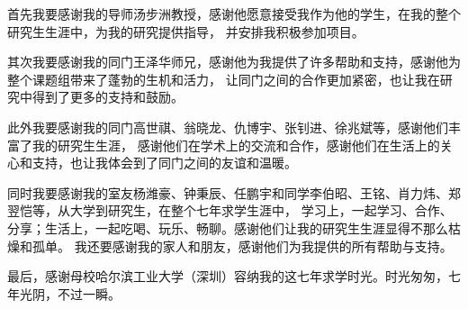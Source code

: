 
\begin{acknowledgements}

    首先我要感谢我的导师汤步洲教授，感谢他愿意接受我作为他的学生，在我的整个研究生生涯中，为我的研究提供指导，
    并安排我积极参加项目。

    其次我要感谢我的同门王泽华师兄，感谢他为我提供了许多帮助和支持，感谢他为整个课题组带来了蓬勃的生机和活力，
    让同门之间的合作更加紧密，也让我在研究中得到了更多的支持和鼓励。

    此外我要感谢我的同门高世祺、翁晓龙、仇博宇、张钊进、徐兆斌等，感谢他们丰富了我的研究生生涯，
    感谢他们在学术上的交流和合作，感谢他们在生活上的关心和支持，也让我体会到了同门之间的友谊和温暖。

    同时我要感谢我的室友杨潍豪、钟秉辰、任鹏宇和同学李伯昭、王铭、肖力炜、郑翌恺等，从大学到研究生，在整个七年求学生涯中，
    学习上，一起学习、合作、分享；生活上，一起吃喝、玩乐、畅聊。感谢他们让我的研究生生涯显得不那么枯燥和孤单。
    我还要感谢我的家人和朋友，感谢他们为我提供的所有帮助与支持。

    最后，感谢母校哈尔滨工业大学（深圳）容纳我的这七年求学时光。时光匆匆，七年光阴，不过一瞬。

\end{acknowledgements}
